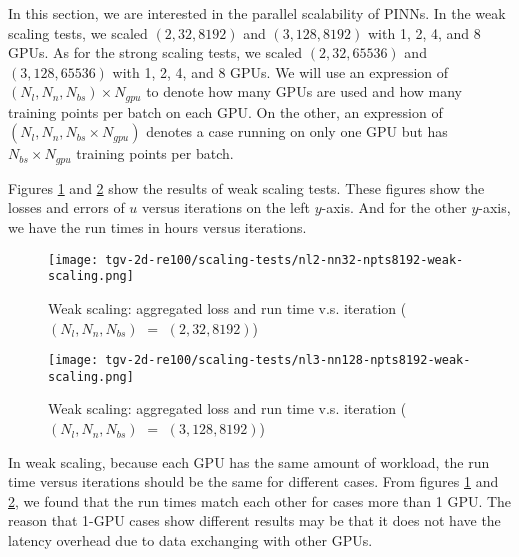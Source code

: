 
In this section, we are interested in the parallel scalability of PINNs.
In the weak scaling tests, we scaled $(2, 32, 8192)$ and $(3, 128, 8192)$ with 1, 2, 4, and 8 GPUs. 
As for the strong scaling tests, we scaled $(2, 32, 65536)$ and $(3, 128, 65536)$ with 1, 2, 4, and 8 GPUs. 
We will use an expression of $(N_l, N_n, N_{bs})\times N_{gpu}$ to denote how many GPUs are used and how many training points per batch on each GPU.
On the other, an expression of $(N_l, N_n, N_{bs}\times N_{gpu})$ denotes a case running on only one GPU but has $N_{bs}\times N_{gpu}$ training points per batch.

Figures \ref{fig:nl2-nn32-npts8192-weak-scaling} and \ref{fig:nl3-nn128-npts8192-weak-scaling} show the results of weak scaling tests.
These figures show the losses and errors of $u$ versus iterations on the left $y$-axis.
And for the other $y$-axis, we have the run times in hours versus iterations.

\begin{figure}[hbt!]
    \centering%
    \texttt{[image: tgv-2d-re100/scaling-tests/nl2-nn32-npts8192-weak-scaling.png]}
    \caption[%
        Weak scaling: aggregated loss and run time v.s. iteration ($(N_l, N_n, N_{bs})$ $=$ $(2, 32, 8192)$)%
    ]{%
        Weak scaling: aggregated loss and run time v.s. iteration ($(N_l, N_n, N_{bs})$ $=$ $(2, 32, 8192)$)%
    }\label{fig:nl2-nn32-npts8192-weak-scaling}
\end{figure}

\begin{figure}[hbt!]
    \centering%
    \texttt{[image: tgv-2d-re100/scaling-tests/nl3-nn128-npts8192-weak-scaling.png]}
    \caption[%
        Weak scaling: aggregated loss and run time v.s. iteration ($(N_l, N_n, N_{bs})$ $=$ $(3, 128, 8192)$)%
    ]{%
        Weak scaling: aggregated loss and run time v.s. iteration ($(N_l, N_n, N_{bs})$ $=$ $(3, 128, 8192)$)%
    }\label{fig:nl3-nn128-npts8192-weak-scaling}
\end{figure}

In weak scaling, because each GPU has the same amount of workload, the run time versus iterations should be the same for different cases.
From figures \ref{fig:nl2-nn32-npts8192-weak-scaling} and \ref{fig:nl3-nn128-npts8192-weak-scaling}, we found that the run times match each other for cases more than 1 GPU.
The reason that 1-GPU cases show different results may be that it does not have the latency overhead due to data exchanging with other GPUs.

